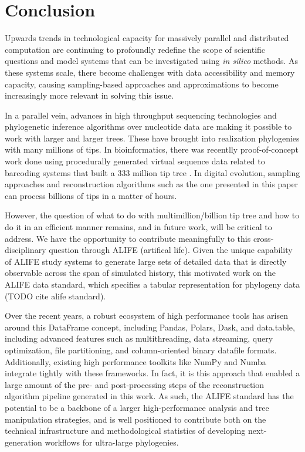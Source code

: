 \section{Conclusion} \label{sec:conclusion}

Upwards trends in technological capacity for massively parallel and distributed computation are continuing to profoundly redefine the scope of scientific questions and model systems that can be investigated using \textit{in silico} methods.
As these systems scale, there become challenges with data accessibility and memory capacity, causing sampling-based approaches and approximations to become increasingly more relevant in solving this issue.

In a parallel vein, advances in high throughput sequencing technologies and phylogenetic inference algorithms over nucleotide data are making it possible to work with larger and larger trees.
These have brought into realization phylogenies with many millions of tips.
In bioinformatics, there was recentlly proof-of-concept work done using procedurally generated virtual sequence data related to barcoding systems that built a 333 million tip tree \citep{konno2022deep}.
In digital evolution, sampling approaches and reconstruction algorithms such as the one presented in this paper can process billions of tips in a matter of hours.

However, the question of what to do with multimillion/billion tip tree and how to do it in an efficient manner remains, and in future work, will be critical to address.
We have the opportunity to contribute meaningfully to this cross-disciplinary question through ALIFE (artifical life).
Given the unique capability of ALIFE study systems to generate large sets of detailed data that is directly observable across the span of simulated history, this motivated work on the ALIFE data standard, which specifies a tabular representation for phylogeny data (TODO cite alife standard). 

Over the recent years, a robust ecosystem of high performance tools has arisen around this DataFrame concept, including Pandas, Polars, Dask, and data.table, including advanced features such as multithreading, data streaming, query optimization, file partitioning, and column-oriented binary datafile formats. 
Additionally, existing high performance toolkits like NumPy and Numba integrate tightly with these frameworks.
In fact, it is this approach that enabled a large amount of the pre- and post-processing steps of the reconstruction algorithm pipeline generated in this work.
As such, the ALIFE standard has the potential to be a backbone of a larger high-performance analysis and tree manipulation strategies, and is well positioned to contribute both on the technical infrastructure and methodological statistics of developing next-generation workflows for ultra-large phylogenies.

